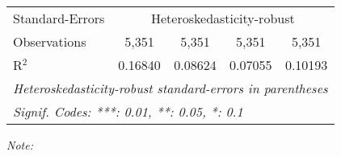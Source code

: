 \begin{table}[htbp!]
\begin{adjustbox}{width = 1\textwidth, max height = 0.95\textheight, center}
\begin{threeparttable}[b]
\begin{tabular}{lcccc}
            \midrule 
            Standard-Errors & \multicolumn{4}{c}{Heteroskedasticity-robust} \\ 
            Observations         & 5,351                           & 5,351                          & 5,351                          & 5,351\\  
            R$^2$                & 0.16840                         & 0.08624                        & 0.07055                        & 0.10193\\  
            \midrule \midrule
            \multicolumn{5}{l}{\emph{Heteroskedasticity-robust standard-errors in parentheses}}\\
            \multicolumn{5}{l}{\emph{Signif. Codes: ***: 0.01, **: 0.05, *: 0.1}}\\
         \end{tabular}
         
         \begin{tablenotes}\item \medskip \textit{Note:}
         \end{tablenotes}
      \end{threeparttable}
   \end{adjustbox}
\end{table}


